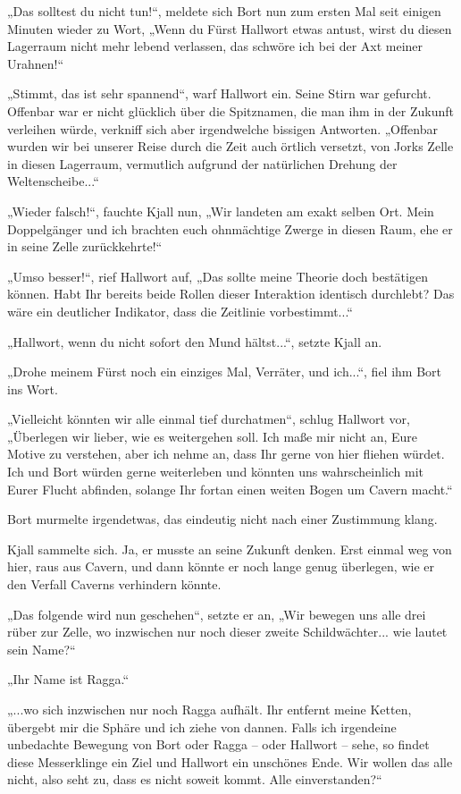 \documentclass[10pt, a4paper, oneside]{book}
\begin{document}
„Das solltest du nicht tun!“, meldete sich Bort nun zum ersten Mal seit einigen Minuten wieder zu Wort, „Wenn du Fürst Hallwort etwas antust, wirst du diesen Lagerraum nicht mehr lebend verlassen, das schwöre ich bei der Axt meiner Urahnen!“

„Stimmt, das ist sehr spannend“, warf Hallwort ein. Seine Stirn war gefurcht. Offenbar war er nicht glücklich über die Spitznamen, die man ihm in der Zukunft verleihen würde, verkniff sich aber irgendwelche bissigen Antworten. „Offenbar wurden wir bei unserer Reise durch die Zeit auch örtlich versetzt, von Jorks Zelle in diesen Lagerraum, vermutlich aufgrund der natürlichen Drehung der Weltenscheibe...“

„Wieder falsch!“, fauchte Kjall nun, „Wir landeten am exakt selben Ort. Mein Doppelgänger und ich brachten euch ohnmächtige Zwerge in diesen Raum, ehe er in seine Zelle zurückkehrte!“

„Umso besser!“, rief Hallwort auf, „Das sollte meine Theorie doch bestätigen können. Habt Ihr bereits beide Rollen dieser Interaktion identisch durchlebt? Das wäre ein deutlicher Indikator, dass die Zeitlinie vorbestimmt...“

„Hallwort, wenn du nicht sofort den Mund hältst...“, setzte Kjall an.

„Drohe meinem Fürst noch ein einziges Mal, Verräter, und ich...“, fiel ihm Bort ins Wort.

„Vielleicht könnten wir alle einmal tief durchatmen“, schlug Hallwort vor, „Überlegen wir lieber, wie es weitergehen soll. Ich maße mir nicht an, Eure Motive zu verstehen, aber ich nehme an, dass Ihr gerne von hier fliehen würdet. Ich und Bort würden gerne weiterleben und könnten uns wahrscheinlich mit Eurer Flucht abfinden, solange Ihr fortan einen weiten Bogen um Cavern macht.“

Bort murmelte irgendetwas, das eindeutig nicht nach einer Zustimmung klang.

Kjall sammelte sich. Ja, er musste an seine Zukunft denken. Erst einmal weg von hier, raus aus Cavern, und dann könnte er noch lange genug überlegen, wie er den Verfall Caverns verhindern könnte.

„Das folgende wird nun geschehen“, setzte er an, „Wir bewegen uns alle drei rüber zur Zelle, wo inzwischen nur noch dieser zweite Schildwächter... wie lautet sein Name?“

„Ihr Name ist Ragga.“

„...wo sich inzwischen nur noch Ragga aufhält. Ihr entfernt meine Ketten, übergebt mir die Sphäre und ich ziehe von dannen. Falls ich irgendeine unbedachte Bewegung von Bort oder Ragga – oder Hallwort – sehe, so findet diese Messerklinge ein Ziel und Hallwort ein unschönes Ende. Wir wollen das alle nicht, also seht zu, dass es nicht soweit kommt. Alle einverstanden?“
\end{document}
